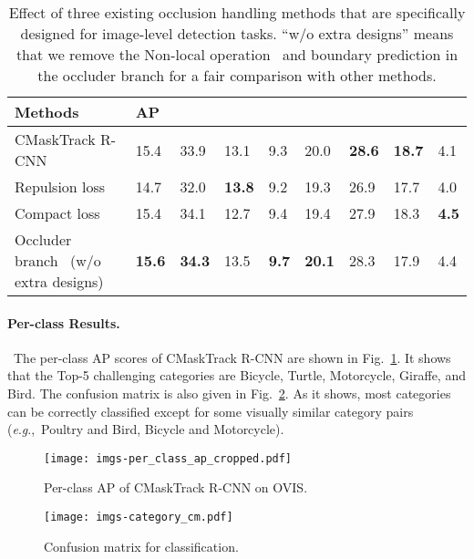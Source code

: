 \documentclass[twocolumn]{svjour3}          \smartqed  \usepackage{graphicx}
\newcommand{\eg}{\textit{e}.\textit{g}.}
\def\myTextColor{\textcolor[rgb]{0, 0, 0}}
\begin{document}
\begin{sloppypar}
\begin{table*}
\centering
\begin{tabular}{|l|p{0.48cm}<{\centering}p{0.48cm}<{\centering}p{0.57cm}<{\centering}p{0.48cm}<{\centering}p{0.6cm}<{\centering}|p{0.6cm}<{\centering}p{0.6cm}<{\centering}p{0.6cm}<{\centering}|}
\hline
Methods & AP  &   &   &   &  &   &   &  \\
\hline
\hline
CMaskTrack R-CNN & 15.4 & 33.9 & 13.1 & 9.3 & 20.0 & \textbf{28.6} & \textbf{18.7} & 4.1 \\
 Repulsion loss~\cite{repulsion} & 14.7 & 32.0 & \textbf{13.8} & 9.2 & 19.3 & 26.9 & 17.7 & 4.0 \\
 Compact loss~\cite{orcnn} & 15.4 & 34.1 & 12.7 & 9.4 & 19.4 & 27.9 & 18.3 & \textbf{4.5} \\
 Occluder branch~\cite{bcnet} (w/o extra designs) & \textbf{15.6} & \textbf{34.3} & 13.5 & \textbf{9.7} & \textbf{20.1} & 28.3 & 17.9 & 4.4 \\
\hline
\end{tabular}
\caption{\myTextColor{Effect of three existing occlusion handling methods that are specifically designed for image-level detection tasks. ``w/o extra designs'' means that we remove the Non-local operation~\cite{nonlocal} and boundary prediction in the occluder branch for a fair comparison with other methods.}}
\label{tb:occlusion_methods}
\end{table*}


\paragraph{Per-class Results.}~The per-class AP scores of CMaskTrack R-CNN are shown in Fig.~\ref{fig:ap_per_class}. It shows that the Top-5 challenging categories are Bicycle, Turtle, Motorcycle, Giraffe, and Bird. The confusion matrix is also given in Fig.~\ref{fig:cm}. As it shows, most categories can be correctly classified except for some visually similar category pairs (\eg,~Poultry and Bird, Bicycle and Motorcycle).

\begin{figure}[t]
\centering
 \texttt{[image: imgs-per\_class\_ap\_cropped.pdf]}
 \caption{Per-class AP of CMaskTrack R-CNN on OVIS.}
\label{fig:ap_per_class}
\end{figure}

\begin{figure}[t]
\centering
 \texttt{[image: imgs-category\_cm.pdf]}
 \caption{Confusion matrix for classification.}
\label{fig:cm}
\end{figure}



\end{sloppypar}
\end{document}
